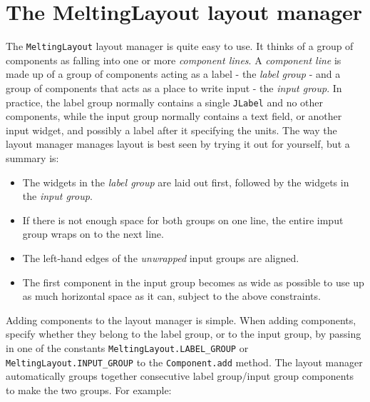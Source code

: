 \documentclass{article}
\begin{document}
\section{The {\ttfamily MeltingLayout} layout manager}

The \texttt{MeltingLayout} layout manager is quite easy to use.  It thinks of a
group of components as falling into one or more \emph{component lines}.  A
\emph{component line} is made up of a group of components acting as a label - 
the \emph{label group} - and a group of components that acts as a place to
write input - the \emph{input group}.  In practice, the label group normally
contains a single \texttt{JLabel} and no other components, while the input
group normally contains a text field, or another input widget, and possibly a 
label after it specifying the units.  The way the layout manager manages layout
is best seen by trying it out for yourself, but a summary is:
\begin{itemize}
  \item The widgets in the \emph{label group} are laid out first, followed by
  the widgets in the \emph{input group}.  
  \item If there is not enough space for both groups on one line, the entire
  imput group wraps on to the next line.
  \item The left-hand edges of the \emph{unwrapped} input groups are aligned.
  \item The first component in the input group becomes as wide as possible to 
  use up as much horizontal space as it can, subject to the above constraints.
\end{itemize}

Adding components to the layout manager is simple.  When adding components,
specify whether they belong to the label group, or to the input group, by
passing in one of the constants \texttt{MeltingLayout.LABEL\_GROUP} or
\texttt{MeltingLayout.INPUT\_GROUP} to the \texttt{Component.add} method.  The
layout manager automatically groups together consecutive label group/input
group components to make the two groups.  For example: 
\end{document}
